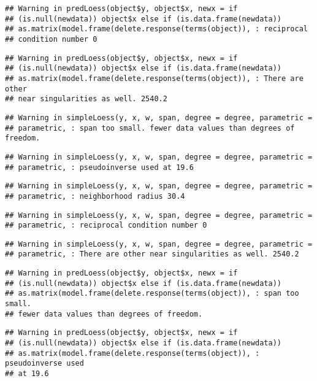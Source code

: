 \documentclass[]{article}
\begin{document}
\begin{verbatim}
## Warning in predLoess(object$y, object$x, newx = if
## (is.null(newdata)) object$x else if (is.data.frame(newdata))
## as.matrix(model.frame(delete.response(terms(object)), : reciprocal
## condition number 0
\end{verbatim}

\begin{verbatim}
## Warning in predLoess(object$y, object$x, newx = if
## (is.null(newdata)) object$x else if (is.data.frame(newdata))
## as.matrix(model.frame(delete.response(terms(object)), : There are other
## near singularities as well. 2540.2
\end{verbatim}

\begin{verbatim}
## Warning in simpleLoess(y, x, w, span, degree = degree, parametric =
## parametric, : span too small. fewer data values than degrees of freedom.
\end{verbatim}

\begin{verbatim}
## Warning in simpleLoess(y, x, w, span, degree = degree, parametric =
## parametric, : pseudoinverse used at 19.6
\end{verbatim}

\begin{verbatim}
## Warning in simpleLoess(y, x, w, span, degree = degree, parametric =
## parametric, : neighborhood radius 30.4
\end{verbatim}

\begin{verbatim}
## Warning in simpleLoess(y, x, w, span, degree = degree, parametric =
## parametric, : reciprocal condition number 0
\end{verbatim}

\begin{verbatim}
## Warning in simpleLoess(y, x, w, span, degree = degree, parametric =
## parametric, : There are other near singularities as well. 2540.2
\end{verbatim}

\begin{verbatim}
## Warning in predLoess(object$y, object$x, newx = if
## (is.null(newdata)) object$x else if (is.data.frame(newdata))
## as.matrix(model.frame(delete.response(terms(object)), : span too small.
## fewer data values than degrees of freedom.
\end{verbatim}

\begin{verbatim}
## Warning in predLoess(object$y, object$x, newx = if
## (is.null(newdata)) object$x else if (is.data.frame(newdata))
## as.matrix(model.frame(delete.response(terms(object)), : pseudoinverse used
## at 19.6
\end{verbatim}
\end{document}
